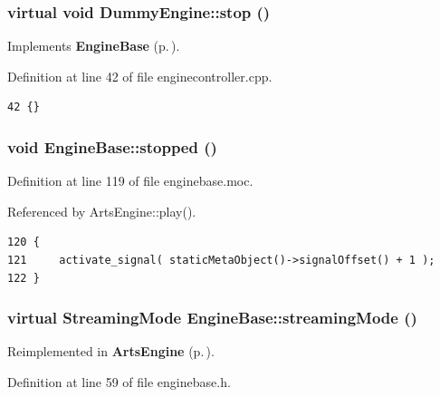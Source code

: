 \subsubsection{\setlength{\rightskip}{0pt plus 5cm}virtual void Dummy\-Engine::stop ()\hspace{0.3cm}{\tt  [inline, private, virtual]}}\label{classDummyEngine_DummyEngined9}




Implements {\bf Engine\-Base} {\rm (p.\,\pageref{classEngineBase_EngineBasei2})}.

Definition at line 42 of file enginecontroller.cpp.



\footnotesize\begin{verbatim}42 {}
\end{verbatim}\normalsize 
{}
\subsubsection{\setlength{\rightskip}{0pt plus 5cm}void Engine\-Base::stopped ()\hspace{0.3cm}{\tt  [signal, inherited]}}\label{classEngineBase_EngineBasel1}




Definition at line 119 of file enginebase.moc.

Referenced by Arts\-Engine::play().



\footnotesize\begin{verbatim}120 {
121     activate_signal( staticMetaObject()->signalOffset() + 1 );
122 }
\end{verbatim}\normalsize 
{}
\subsubsection{\setlength{\rightskip}{0pt plus 5cm}virtual {\bf Streaming\-Mode} Engine\-Base::streaming\-Mode ()\hspace{0.3cm}{\tt  [inline, virtual, inherited]}}\label{classEngineBase_EngineBasea5}




Reimplemented in {\bf Arts\-Engine} {\rm (p.\,\pageref{classArtsEngine_ArtsEnginea5})}.

Definition at line 59 of file enginebase.h.

